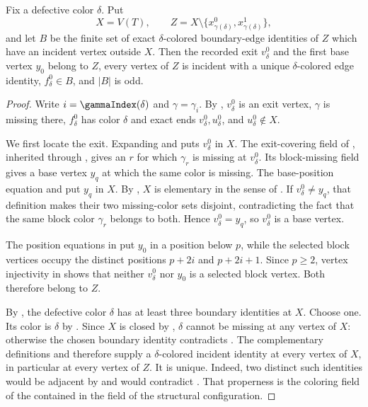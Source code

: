 \begin{helper}
Fix a defective color $\delta$.  Put
\[
 X=V(T),\qquad
 Z=X\setminus\{x^0_{\gamma(\delta)},x^1_{\gamma(\delta)}\},
\]
and let $B$ be the finite set of exact $\delta$-colored boundary-edge
identities of $Z$ which have an incident vertex outside $X$.  Then the
recorded exit $v^0_\delta$ and the first base vertex $y_0$ belong to $Z$,
every vertex of $Z$ is incident with a unique $\delta$-colored edge
identity, $f^0_\delta\in B$, and $|B|$ is odd.
\end{helper}
\begin{proof}
Write $i=\gammaIndex(\delta)$ and $\gamma=\gamma_i$.  By
, $v^0_\delta$ is an exit vertex,
$\gamma$ is missing there, $f^0_\delta$ has color $\delta$ and exact
ends $v^0_\delta,u^0_\delta$, and $u^0_\delta\notin X$.

We first locate the exit.  Expanding  and
 puts $v^0_\delta$ in $X$.  The exit-covering
field of , inherited through
, gives an $r$ for which $\gamma_r$
is missing at $v^0_\delta$.  Its block-missing field gives a base vertex
$y_q$ at which the same color is missing.  The base-position equation and
 put $y_q$ in $X$.  By
, $X$ is elementary in the sense of
.  If $v^0_\delta\ne y_q$, that
definition makes their two missing-color sets disjoint, contradicting
the fact that the same block color $\gamma_r$ belongs to both.  Hence
$v^0_\delta=y_q$, so $v^0_\delta$ is a base vertex.

The position equations in  put
$y_0$ in a position below $p$, while the selected block vertices occupy
the distinct positions $p+2i$ and $p+2i+1$.  Since $p\ge2$, vertex
injectivity in  shows that neither $v^0_\delta$
nor $y_0$ is a selected block vertex.  Both therefore belong to $Z$.

By , the defective color
$\delta$ has at least three boundary identities at $X$.  Choose one.
Its color is $\delta$ by .  Since $X$ is
closed by , $\delta$ cannot be missing
at any vertex of $X$: otherwise the chosen boundary identity contradicts
.  The complementary definitions
 and  therefore supply a
$\delta$-colored incident identity at every vertex of $X$, in particular
at every vertex of $Z$.  It is unique.  Indeed, two distinct such
identities would be adjacent by  and would
contradict .  That properness is the
coloring field of the  contained in the
 field of the structural configuration.


\end{proof}
